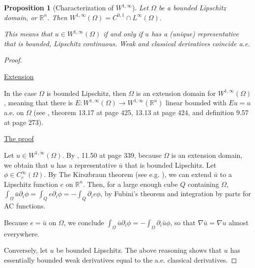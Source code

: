 \documentclass[english,a4paper,10pt,oneside]{scrbook}	%
\theoremstyle{break}
\newtheorem{prop}[equation]{Proposition}
\newenvironment{mproof}[1][\proofname]{%
  \begin{proof}[#1]$ $\par\nobreak\ignorespaces
}{%
  \end{proof}
}
\renewcommand*{\proofname}{Proof}
\theoremstyle{remark}
\newcommand{\ds}{\displaystyle}
\newcommand{\cc}{\subset\subset}
\begin{document}
\begin{prop}[Characterization of $W^{1,\infty}$]
\label{prop:lip}
Let $\Omega$ be a bounded Lipschitz domain, or $\mathbb{R}^n$. Then $W^{1,\infty}(\Omega) = C^{0,1}\cap L^\infty(\Omega)$.

This means that $u\in W^{1,\infty}(\Omega)$ if and only if $u$ has a (unique) representative that is bounded, Lipschitz continuous. Weak and classical derivatives coincide a.e.
\end{prop}
\begin{mproof}

%
%
%
%

\underline{Extension}

In the case $\Omega$ is bounded Lipschitz, then $\Omega$ is an extension domain for $W^{1,\infty}(\Omega)$, meaning that there is $E: W^{1,\infty}(\Omega)\rightarrow W^{1,\infty}(\mathbb{R}^n)$ linear bounded with $Eu=u$ a.e. on $\Omega$ (see \cite{leoni}, theorem 13.17 at page 425, 13.13 at page 424, and definition 9.57 at page 273).

\underline{The proof}

Let $u \in  W^{1,\infty}(\Omega)$. By \cite{leoni}, 11.50 at page 339, because $\Omega$ is an extension domain, we obtain that $u$ has a representative $\bar{u}$ that is bounded Lipschitz. Let $\phi \in C_c^\infty(\Omega)$. By The Kirszbraun theorem (see e.g. \cite{kirszbraun}), we can extend $\bar{u}$ to a Lipschitz function $e$ on $\mathbb{R}^n$. Then, for a large enough cube $Q$ containing $\Omega$, $\ds \int_\Omega\bar{u}\partial_i\phi = \int_Q e \partial_i \phi  = -\int_Q \partial_i e \phi $, by Fubini's theorem and integration by parts for AC functions.

Because $e=\bar{u}$	on $\Omega$, we conclude $\ds \int_\Omega\bar{u}\partial_i\phi =-\int_{\Omega} \partial_i \bar{u} \phi $, so that $\nabla \bar{u} = \nabla u$ almost everywhere.

Conversely, let $u$ be bounded Lipschitz. The above reasoning shows that $u$ has essentially bounded weak derivatives equal to the a.e. classical derivatives.

\end{mproof}
\end{document}
